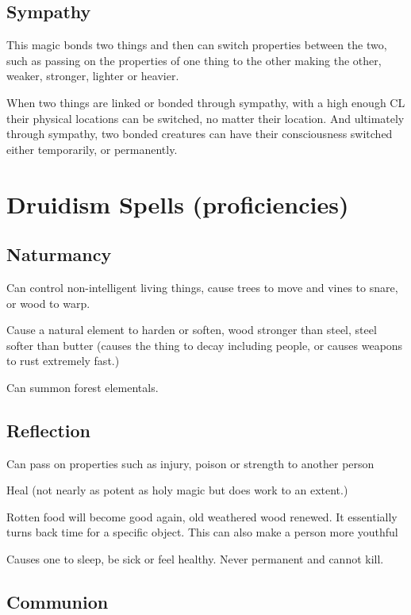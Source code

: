\subsection{Sympathy}

This magic bonds two things and then can switch properties between the two, such as passing on the properties of one thing to the other making the other, weaker, stronger, lighter or heavier.

When two things are linked or bonded through sympathy, with a high enough CL their physical locations can be switched, no matter their location. And ultimately through sympathy, two bonded creatures can have their consciousness switched either temporarily, or permanently.

\section{Druidism Spells (proficiencies)}

\subsection{Naturmancy}

Can control non-intelligent living things, cause trees to move and vines to snare, or wood to warp.

Cause a natural element to harden or soften, wood stronger than steel, steel softer than butter (causes the thing to decay including people, or causes weapons to rust extremely fast.)

Can summon forest elementals.

\subsection{Reflection}

Can pass on properties such as injury, poison or strength to another person

Heal (not nearly as potent as holy magic but does work to an extent.)

Rotten food will become good again, old weathered wood renewed. It essentially turns back time for a specific object. This can also make a person more youthful

Causes one to sleep, be sick or feel healthy. Never permanent and cannot kill.

\subsection{Communion}

